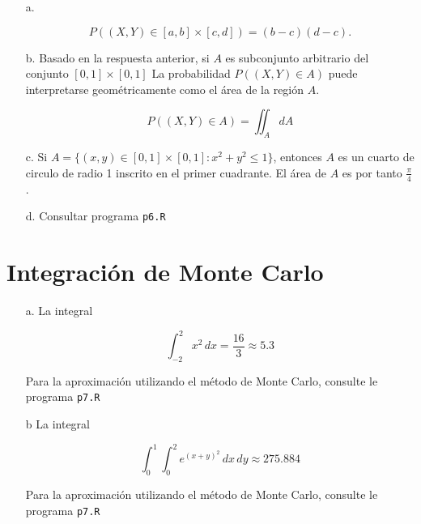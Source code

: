 \documentclass[11pt,letterpaper]{article}
\begin{document}
	\begin{itemize}
		\item[a.] 
		
		\[
		P((X,Y) \in [a,b]\times[c,d]) = (b-c)(d-c).
		\]
		
		\item[b.] Basado en la respuesta anterior, si $A$ es subconjunto arbitrario del conjunto $[0,1]\times[0,1]$ La probabilidad $P((X,Y) \in A)$ puede interpretarse geométricamente como el área de la región $A$.
		
		\[
		P((X,Y) \in A) = \iint_A dA
		\]
		
		\item[c.] Si $A = \{(x,y)  \in [0,1]\times[0,1]: x^2 + y^2 \leq 1 \}$, entonces $A$ es un cuarto de circulo de radio 1 inscrito en el primer cuadrante. El área de $A$ es por tanto $\frac{\pi}{4}$.
		
		\item[d.] Consultar programa \texttt{p6.R}
	\end{itemize}

	\section{Integración de Monte Carlo}
	
	\begin{itemize}
		\item[a.] La integral
		
		\[
		\int_{-2}^{2} x^2 \, dx = \frac{16}{3} \approx 5.3
		\]
		
		Para la aproximación utilizando el método de Monte Carlo, consulte le programa \texttt{p7.R}
		
		\item[b] La integral
		
		\[
		\int_{0}^{1}\int_{0}^{2} e^{(x+y)^2} \, dx\,dy  \approx 275.884
		\]
		
		Para la aproximación utilizando el método de Monte Carlo, consulte le programa \texttt{p7.R}
		
	\end{itemize}
	
\end{document}

